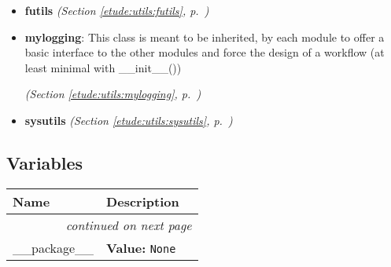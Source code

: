 \begin{itemize}
\begin{itemize}
    \item \textbf{futils}
  \textit{(Section \ref{etude:utils:futils}, p.~\pageref{etude:utils:futils})}

    \item \textbf{mylogging}: This class is meant to be inherited, by each module to offer a basic 
interface to the other modules and force the design of a workflow (at least
minimal with \_\_init\_\_())



  \textit{(Section \ref{etude:utils:mylogging}, p.~\pageref{etude:utils:mylogging})}

    \item \textbf{sysutils}
  \textit{(Section \ref{etude:utils:sysutils}, p.~\pageref{etude:utils:sysutils})}

  \end{itemize}
\end{itemize}



  \subsection{Variables}

    \vspace{-1cm}
\hspace{\varindent}\begin{longtable}{|p{\varnamewidth}|p{\vardescrwidth}|l}
\cline{1-2}
\cline{1-2} \centering \textbf{Name} & \centering \textbf{Description}& \\
\cline{1-2}
\endhead\cline{1-2}\multicolumn{3}{r}{\small\textit{continued on next page}}\\\endfoot\cline{1-2}
\endlastfoot\raggedright \_\-\_\-p\-a\-c\-k\-a\-g\-e\-\_\-\_\- & \raggedright \textbf{Value:} 
{\tt None}&\\
\cline{1-2}
\end{longtable}

